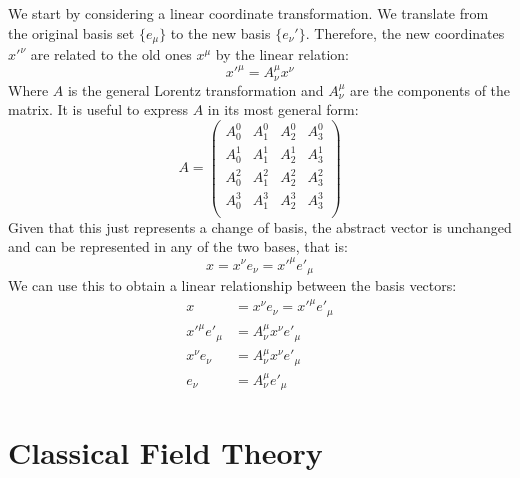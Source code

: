 \vspace{2mm}\noindent We start by considering a linear coordinate transformation. We translate from the original basis set $\{e_\mu\}$ to the new basis $\{e_\nu'\}$.  Therefore, the new coordinates $x'^\nu$ are related to the old ones $x^\mu$ by the linear relation:
\begin{equation}
    x'^\mu = A^\mu_\nu x^\nu
\end{equation}
Where $A$ is the general Lorentz transformation and $A^\mu_\nu$ are the components of the matrix. It is useful to express $A$ in its most general form:
\begin{equation}
    A =  \begin{pmatrix}A^0_0 & A^0_1 & A^0_2 & A^0_3\\
A^1_0 & A^1_1 & A^1_2 & A^1_3\\
A^2_0 & A^2_1 & A^2_2 & A^2_3\\
A^3_0 & A^3_1 & A^3_2 & A^3_3\\
\end{pmatrix}
\end{equation}
Given that this just represents a change of basis, the abstract vector is unchanged and can be represented in any of the two bases, that is:
\begin{equation}
    x = x^\nu e_\nu = x'^\mu e'_\mu
\end{equation}
We can use this to obtain a linear relationship between the basis vectors:
\begin{align}
    x &=  x^\nu e_\nu = x'^\mu e'_\mu\\
     x'^\mu e'_\mu &=  A^\mu_\nu x^\nu  e'_\mu \\ 
    x^\nu e_\nu &=  A^\mu_\nu x^\nu  e'_\mu\\
     e_\nu &=  A^\mu_\nu e'_\mu
\end{align}
\section{Classical Field Theory}
